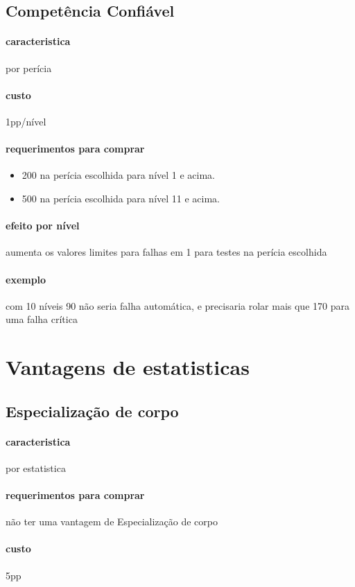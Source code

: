 \subsection{Competência Confiável}
\paragraph{caracteristica} por perícia
\paragraph{custo} 1pp/nível
\paragraph{requerimentos para comprar}
\begin{itemize}
  \item 200 na perícia escolhida para nível 1 e acima.
  \item 500 na perícia escolhida para nível 11 e acima.
\end{itemize}
\paragraph{efeito por nível} aumenta os valores limites para falhas em 1 para testes na perícia escolhida
\paragraph{exemplo} com 10 níveis 90 não seria falha automática, e precisaria rolar mais que 170 para uma falha crítica
%
%
\section{Vantagens de estatisticas}
%
\subsection{Especialização de corpo}
\paragraph{caracteristica} por estatistica
\paragraph{requerimentos para comprar} não ter uma vantagem de Especialização de corpo
\paragraph{custo} 5pp
